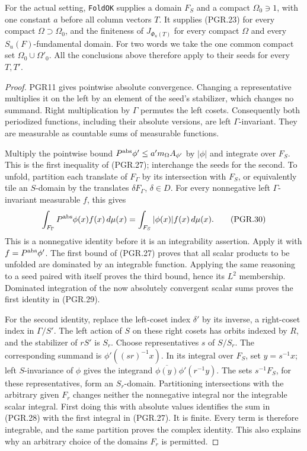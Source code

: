 For the actual setting, \texttt{FoldOK} supplies a domain \(F_S\)
and a compact \(\Omega_0\ni1\), with one constant \(a\)
before all column vectors \(T\).  It supplies (PGR.23) for every
compact \(\Omega\supset\Omega_0\), and the finiteness of
\(J_{\Phi_u(T)}\) for every compact \(\Omega\) and every
\(S_u(F)\)-fundamental domain.  For two words we take the one
common compact set \(\Omega_0\cup\Omega'_0\).  All the
conclusions above therefore apply to their seeds for every \(T,T'\).
\begin{proof}
PGR11 gives pointwise absolute convergence.  Changing a representative
multiplies it on the left by an element of the seed's stabilizer,
which changes no summand.  Right multiplication by \(\Gamma\)
permutes the left cosets.  Consequently both periodized functions,
including their absolute versions, are left \(\Gamma\)-invariant.
They are measurable as countable sums of measurable functions.

Multiply the pointwise bound
\(P^{\rm abs}\phi'\leq a'm_\Omega A_{\phi'}\)
by \(|\phi|\) and integrate over \(F_S\).  This is the
first inequality of (PGR.27); interchange the seeds for the second.
To unfold, partition each translate of \(F_\Gamma\) by its
intersection with \(F_S\), or equivalently tile an
\(S\)-domain by the translates \(\delta F_\Gamma\),
\(\delta\in D\).  For every nonnegative left
\(\Gamma\)-invariant measurable \(f\), this gives
\[
 \int_{F_\Gamma}P^{\rm abs}\phi(x) f(x)\,d\mu(x)
                 =\int_{F_S}|\phi(x)|f(x)\,d\mu(x).
\tag{PGR.30}
\]
This is a nonnegative identity before it is an integrability assertion.
Apply it with \(f=P^{\rm abs}\phi'\).  The first bound of
(PGR.27) proves that all scalar products to be unfolded are dominated
by an integrable function.  Applying the same reasoning to a seed
paired with itself proves the third bound, hence its \(L^2\)
membership.  Dominated integration of the now absolutely convergent
scalar sums proves the first identity in (PGR.29).

For the second identity, replace the left-coset index \(\delta'\)
by its inverse, a right-coset index in \(\Gamma/S'\).  The left
action of \(S\) on these right cosets has orbits indexed by
\(R\), and the stabilizer of \(rS'\) is \(S_r\).
Choose representatives \(s\) of \(S/S_r\).  The corresponding
summand is \(\phi'((sr)^{-1}x)\).  In its integral over
\(F_S\), set \(y=s^{-1}x\); left \(S\)-invariance of
\(\phi\) gives the integrand
\(\overline{\phi(y)}\phi'(r^{-1}y)\).
The sets \(s^{-1}F_S\), for these representatives, form an
\(S_r\)-domain.  Partitioning intersections with the arbitrary
given \(F_r\) changes neither the nonnegative integral nor the
integrable scalar integral.  First doing this with absolute values
identifies the sum in (PGR.28) with the first integral in (PGR.27).
It is finite.  Every term is therefore integrable, and the same
partition proves the complex identity.  This also explains why an
arbitrary choice of the domains \(F_r\) is permitted.


\end{proof}
